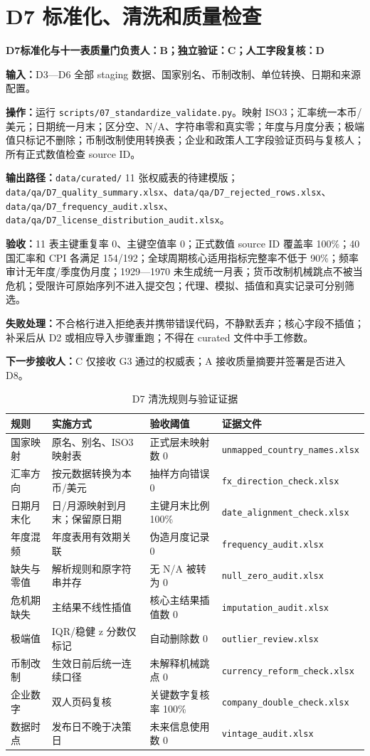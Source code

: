 \documentclass[UTF8,fontset=windows,12pt,openany]{ctexbook}
\newcommand{\File}[1]{{\small\nolinkurl{#1}}}
\newcommand{\StepTitle}[3]{%
  \noindent\colorbox{DeepNavy}{\parbox{0.965\textwidth}{\color{white}\Large\bfseries #1\quad #2\hfill\normalsize #3}}\par\medskip
}
\newcommand{\CardRow}[2]{\noindent\textbf{#1：}#2\par}
\begin{document}
\newpage
\section{D7 标准化、清洗和质量检查}
\StepTitle{D7}{标准化与十一表质量门}{负责人：B；独立验证：C；人工字段复核：D}
\CardRow{输入}{D3—D6 全部 staging 数据、国家别名、币制改制、单位转换、日期和来源配置。}
\CardRow{操作}{运行 \File{scripts/07_standardize_validate.py}。映射 ISO3；汇率统一本币/美元；日期统一月末；区分空、N/A、字符串零和真实零；年度与月度分表；极端值只标记不删除；币制改制使用转换表；企业和政策人工字段验证页码与复核人；所有正式数值检查 source ID。}
\CardRow{输出路径}{\File{data/curated/} 11 张权威表的待建模版；\File{data/qa/D7_quality_summary.xlsx}、\File{data/qa/D7_rejected_rows.xlsx}、\File{data/qa/D7_frequency_audit.xlsx}、\File{data/qa/D7_license_distribution_audit.xlsx}。}
\CardRow{验收}{11 表主键重复率 0、主键空值率 0；正式数值 source ID 覆盖率 100\%；40 国汇率和 CPI 各满足 154/192；全球周期核心适用指标完整率不低于 90\%；频率审计无年度/季度伪月度；1929—1970 未生成统一月表；货币改制机械跳点不被当危机；受限许可原始序列不进入提交包；代理、模拟、插值和真实记录可分别筛选。}
\CardRow{失败处理}{不合格行进入拒绝表并携带错误代码，不静默丢弃；核心字段不插值；补采后从 D2 或相应导入步骤重跑；不得在 curated 文件中手工修数。}
\CardRow{下一步接收人}{C 仅接收 G3 通过的权威表；A 接收质量摘要并签署是否进入 D8。}

\begin{longtable}{p{3.3cm}p{3.2cm}p{3.0cm}p{3.8cm}}
\caption{D7 清洗规则与验证证据}\label{tab:clean-rules}\\
\toprule
\textbf{规则} & \textbf{实施方式} & \textbf{验收阈值} & \textbf{证据文件}\\
\midrule
国家映射 & 原名、别名、ISO3 映射表 & 正式层未映射数 0 & \File{unmapped_country_names.xlsx}\\
汇率方向 & 按元数据转换为本币/美元 & 抽样方向错误 0 & \File{fx_direction_check.xlsx}\\
日期月末化 & 日/月源映射到月末；保留原日期 & 主键月末比例 100\% & \File{date_alignment_check.xlsx}\\
年度混频 & 年度表用有效期关联 & 伪造月度记录 0 & \File{frequency_audit.xlsx}\\
缺失与零值 & 解析规则和原字符串并存 & 无 N/A 被转为 0 & \File{null_zero_audit.xlsx}\\
危机期缺失 & 主结果不线性插值 & 核心主结果插值数 0 & \File{imputation_audit.xlsx}\\
极端值 & IQR/稳健 z 分数仅标记 & 自动删除数 0 & \File{outlier_review.xlsx}\\
币制改制 & 生效日前后统一连续口径 & 未解释机械跳点 0 & \File{currency_reform_check.xlsx}\\
企业数字 & 双人页码复核 & 关键数字复核率 100\% & \File{company_double_check.xlsx}\\
数据时点 & 发布日不晚于决策日 & 未来信息使用数 0 & \File{vintage_audit.xlsx}\\
\bottomrule
\end{longtable}
\end{document}
